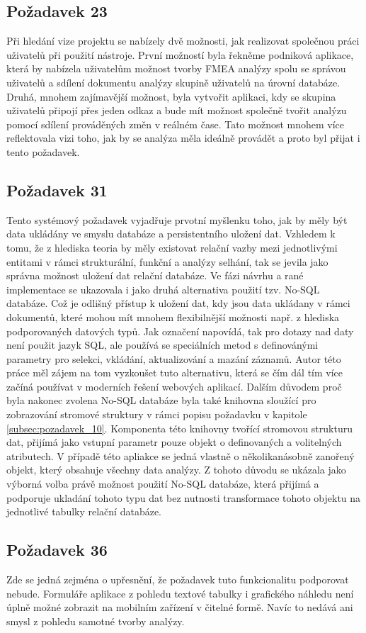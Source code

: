 \subsection{Požadavek 23}
Při hledání vize projektu se nabízely dvě možnosti, jak realizovat společnou práci uživatelů při použití nástroje. První možností byla řekněme podniková aplikace, která by nabízela uživatelům možnost tvorby FMEA analýzy spolu se správou uživatelů a sdílení dokumentu analýzy skupině uživatelů na úrovní databáze. Druhá, mnohem zajímavější možnost, byla vytvořit aplikaci, kdy se skupina uživatelů připojí přes jeden odkaz a bude mít možnost společně tvořit analýzu pomocí sdílení prováděných změn v reálném čase. Tato možnost mnohem více reflektovala vizi toho, jak by se analýza měla ideálně provádět a proto byl přijat i tento požadavek.  

\subsection{Požadavek 31}
\label{sec:pozadavekMongo}
Tento systémový požadavek vyjadřuje prvotní myšlenku toho, jak by měly být data ukládány ve smyslu databáze a persistentního uložení dat. Vzhledem k tomu, že z hlediska teoria by měly existovat relační vazby mezi jednotlivými entitami v rámci strukturální, funkční a analýzy selhání, tak se jevila jako správna možnost uložení dat relační databáze. Ve fázi návrhu a rané implementace se ukazovala i jako druhá alternativa použití tzv. No-SQL databáze. Což je odlišný přístup k uložení dat, kdy jsou data ukládany v rámci dokumentů, které mohou mít mnohem flexibilnější možnosti např. z hlediska podporovaných datových typů. Jak označení napovídá, tak pro dotazy nad daty není použit jazyk SQL, ale používá se speciálních metod s definovánými parametry pro selekci, vkládání, aktualizování a mazání záznamů. Autor této práce měl zájem na tom vyzkoušet tuto alternativu, která se čím dál tím více začíná používat v moderních řešení webových aplikací. Dalším důvodem proč byla nakonec zvolena No-SQL databáze byla také knihovna sloužící pro zobrazování stromové struktury v rámci popisu požadavku v kapitole \ref{subsec:pozadavek_10}. Komponenta této knihovny tvořící stromovou strukturu dat, přijímá jako vstupní parametr pouze objekt o definovaných a volitelných atributech. V případě této apliakce se jedná vlastně o několikanásobně zanořený objekt, který obsahuje všechny data analýzy. Z tohoto důvodu se ukázala jako výborná volba právě možnost použití No-SQL databáze, která přijímá a podporuje ukladání tohoto typu dat bez nutnosti transformace tohoto objektu na jednotlivé tabulky relační databáze. 

\subsection{Požadavek 36}
Zde se jedná zejména o upřesnění, že požadavek tuto funkcionalitu podporovat nebude. Formuláře aplikace z pohledu textové tabulky i grafického náhledu není úplně možné zobrazit na mobilním zařízení v čitelné formě. Navíc to nedává ani smysl z pohledu samotné tvorby analýzy. 

